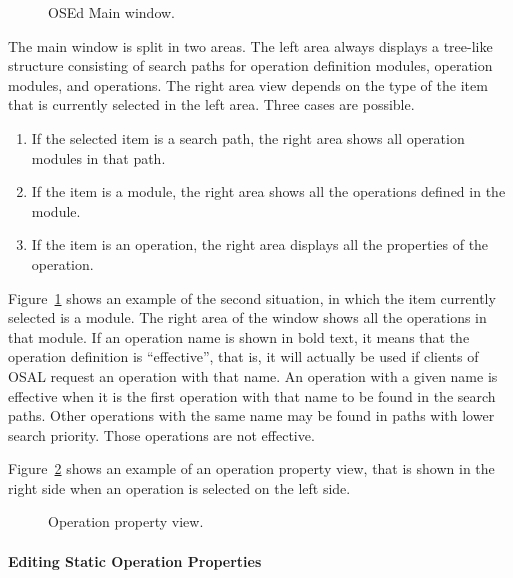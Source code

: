 \documentclass[twoside]{tceusermanual}
\begin{document}
\begin{figure}[tb]
\centerline{}
\caption{OSEd Main window.}
\label{fig:osed_main_window}
\end{figure}

The main window is split in two areas. The left area always displays a
tree-like structure consisting of search paths for operation definition
modules, operation modules, and operations.  The right area view depends on the
type of the item that is currently selected in the left area. Three cases are
possible.
%
\begin{enumerate}
\item %
  If the selected item is a search path, the right area shows all operation
modules in that path.
\item %
  If the item is a module, the right area shows all the operations defined
  in the module.
\item %
  If the item is an operation, the right area displays all the properties of
  the operation.
\end{enumerate}

Figure~\ref{fig:osed_main_window} shows an example of the second situation, in
which the item currently selected is a module. The right area of the window
shows all the operations in that module. If an operation name is shown in
bold text, it means that the operation definition is ``effective'', that is,
it will actually be used if clients of OSAL request an operation with that
name. An operation with a given name is effective when it is the first
operation with that name to be found in the search paths. Other operations
with the same name may be found in paths with lower search priority. Those
operations are not effective.

Figure~\ref{fig:osed_operation_property_view} shows an example of an operation 
property view, that is shown in the right side when an operation is selected 
on the left side.

\begin{figure}[tb]
\centerline{}
\caption{Operation property view.}
\label{fig:osed_operation_property_view}
\end{figure}

\paragraph{Editing Static Operation Properties}
\end{document}
